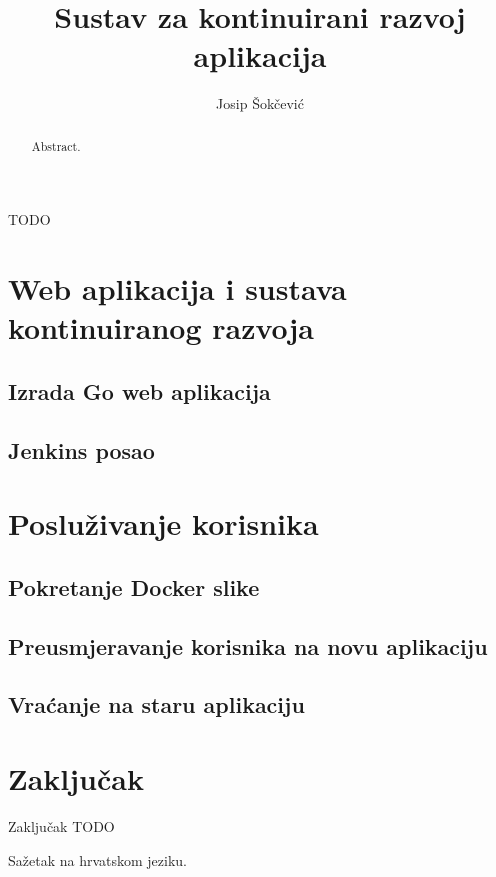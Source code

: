 \documentclass[times, utf8, numeric, diplomski]{ferit}
\begin{document}
\title{Sustav za kontinuirani razvoj aplikacija}

\author{Josip Šokčević}
\maketitle


\zahvala{}
TODO

\tableofcontents





\chapter{Web aplikacija i sustava kontinuiranog razvoja}

\section{Izrada Go web aplikacija}

\section{Jenkins posao}

\chapter{Posluživanje korisnika}

\section{Pokretanje Docker slike}

\section{Preusmjeravanje korisnika na novu aplikaciju}

\section{Vraćanje na staru aplikaciju}

\chapter{Zaključak}
Zaključak TODO




\begin{sazetak}
Sažetak na hrvatskom jeziku.
\end{sazetak}

\begin{abstract}
Abstract.

\end{abstract}
\end{document}
